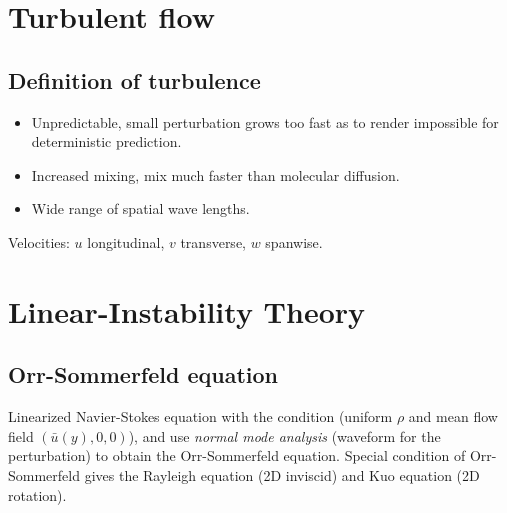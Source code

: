 
%
\section{Turbulent flow}
\subsection{Definition of turbulence}
\begin{itemize}
   \item Unpredictable, small perturbation grows too fast as to render impossible for deterministic prediction.
   \item Increased mixing, mix much faster than molecular diffusion.
   \item Wide range of spatial wave lengths.
\end{itemize}
Velocities: $u$ longitudinal, $v$ transverse, $w$ spanwise.
 
\section{Linear-Instability Theory}
\subsection{Orr-Sommerfeld equation}
Linearized Navier-Stokes equation with the condition (uniform $\rho$ and mean flow field $(\bar{u}(y),0,0)$), and use \emph{normal mode analysis} (waveform for the perturbation) to obtain the Orr-Sommerfeld equation. 
Special condition of Orr-Sommerfeld gives the Rayleigh equation (2D inviscid) and Kuo equation (2D rotation).
